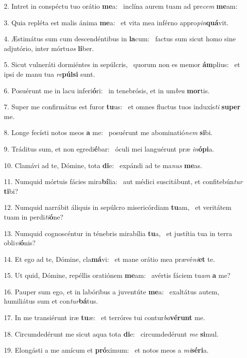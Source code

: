 2. Intret in conspéctu tuo orátio \textbf{me}a: \ast\  inclína aurem tuam ad pre\textit{cem} \textbf{me}am:\

3. Quia repléta est malis ánima \textbf{me}a: \ast\  et vita mea inférno appro\textit{pin}\textbf{quá}vit.\

4. Æstimátus sum cum descendéntibus in \textbf{la}cum: \ast\  factus sum sicut homo sine adjutório, inter mórtu\textit{os} \textbf{li}ber.\

5. Sicut vulneráti dormiéntes in sepúlcris, \dag\  quorum non es memor \textbf{ám}plius: \ast\  et ipsi de manu tua \textit{re}\textbf{púl}\textbf{si} sunt.\

6. Posuérunt me in lacu inferi\textbf{ó}ri: \ast\  in tenebrósis, et in um\textit{bra} \textbf{mor}tis.\

7. Super me confirmátus est furor \textbf{tu}us: \ast\  et omnes fluctus tuos induxís\textit{ti} \textbf{su}\textbf{per} me.\

8. Longe fecísti notos meos \textbf{a} me: \ast\  posuérunt me abominatió\textit{nem} \textbf{si}bi.\

9. Tráditus sum, et non egredi\textbf{é}bar: \ast\  óculi mei languérunt præ \textit{in}\textbf{ó}\textbf{pi}a.\

10. Clamávi ad te, Dómine, tota \textbf{di}e: \ast\  expándi ad te ma\textit{nus} \textbf{me}as.\

11. Numquid mórtuis fácies mira\textbf{bí}lia: \ast\  aut médici suscitábunt, et confitebún\textit{tur} \textbf{ti}bi?\

12. Numquid narrábit áliquis in sepúlcro misericórdiam \textbf{tu}am, \ast\  et veritátem tuam in perdi\textit{ti}\textbf{ó}ne?\

13. Numquid cognoscéntur in ténebris mirabília \textbf{tu}a, \ast\  et justítia tua in terra obli\textit{vi}\textbf{ó}nis?\

14. Et ego ad te, Dómine, cla\textbf{má}vi: \ast\  et mane orátio mea prævé\textit{ni}\textbf{et} te.\

15. Ut quid, Dómine, repéllis oratiónem \textbf{me}am: \ast\  avértis fáciem tu\textit{am} \textbf{a} me?\

16. Pauper sum ego, et in labóribus a juventúte \textbf{me}a: \ast\  exaltátus autem, humiliátus sum et con\textit{tur}\textbf{bá}tus.\

17. In me transiérunt iræ \textbf{tu}æ: \ast\  et terróres tui contur\textit{ba}\textbf{vé}\textbf{runt} me.\

18. Circumdedérunt me sicut aqua tota \textbf{di}e: \ast\  circumdedérunt \textit{me} \textbf{si}mul.\

19. Elongásti a me amícum et \textbf{pró}ximum: \ast\  et notos meos a \textit{mi}\textbf{sé}\textbf{ri}a.\

